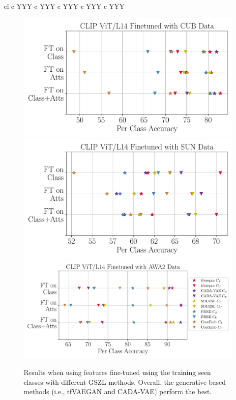 \begin{table}[bp]
\begin{tabularx}{\textwidth}{cl c YYY c YYY c YYY c YYY c YYY}
\bottomrule
\end{tabularx}
\caption{Results of Generative and Disentanglement Based Methods for the CUB, SUN and AWA2 datasets using different features extracted from different size and architecture of the visual head from diverse CLIP models (i.e., Resnet50 (R50) and Vision Transformer (ViT)). The three bottom rows per section correspond to fine-tuned features using sentences with: $\dag$ the class names, $\ddag$ the attributes, and $\S$ both class names and attributes. The bold numbers correspond to the highest scores per column, the underline numbers correspond to the to the highest scores using features not fine-tuned, and the shaded rows correspond to the most performant image feature per method over all.}
\label{tab:gzsl_using_clip_features}
\end{table}


\begin{figure}[h]
\centering
\includegraphics[width=.3\textwidth]{Images/gzsl_results_w_clip_finetuned_cub.pdf}\hfill
\includegraphics[width=.3\textwidth]{Images/gzsl_results_w_clip_finetuned_sun.pdf}\hfill
\includegraphics[width=.37\textwidth]{Images/gzsl_results_w_clip_finetuned_awa2.pdf}
\caption{Results when using features fine-tuned using the training seen classes with different GSZL methods. Overall, the generative-based methods (i.e., tfVAEGAN\cite{tfvaegan} and CADA-VAE\cite{CADA_VAE}) perform the best.}
\label{fig:finetuned_features_res}
\end{figure}



